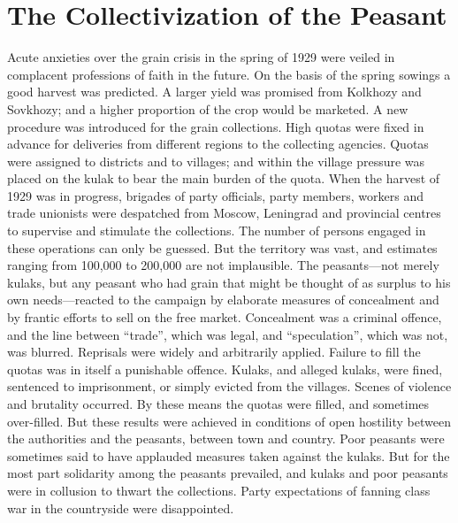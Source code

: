 \chapter{The Collectivization of the Peasant}

Acute anxieties over the grain crisis in the spring of 1929 were veiled in complacent professions of faith in the future. On the basis of the spring sowings a good harvest was predicted. A larger yield was promised from Kolkhozy and Sovkhozy; and a higher proportion of the crop would be marketed. A new procedure was introduced for the grain collections. High quotas were fixed in advance for deliveries from different regions to the collecting agencies. Quotas were assigned to districts and to villages; and within the village pressure was placed on the kulak to bear the main burden of the quota. When the harvest of 1929 was in progress, brigades of party officials, party members, workers and trade unionists were despatched from Moscow, Leningrad and provincial centres to supervise and stimulate the collections. The number of persons engaged in these operations can only be guessed. But the territory was vast, and estimates ranging from 100,000 to 200,000 are not implausible. The peasants---not merely kulaks, but any peasant who had grain that might be thought of as surplus to his own needs---reacted to the campaign by elaborate measures of concealment and by frantic efforts to sell on the free market. Concealment was a criminal offence, and the line between ``trade'', which was legal, and ``speculation'', which was not, was blurred. Reprisals were widely and arbitrarily applied. Failure to fill the quotas was in itself a punishable offence. Kulaks, and alleged kulaks, were fined, sentenced to imprisonment, or simply evicted from the villages. Scenes of violence and brutality occurred. By these means the quotas were filled, and sometimes over-filled. But these results were achieved in conditions of open hostility between the authorities and the peasants, between town and country. Poor peasants were sometimes said to have applauded measures taken against the kulaks. But for the most part solidarity among the peasants prevailed, and kulaks and poor peasants were in collusion to thwart the collections. Party expectations of fanning class war in the countryside were disappointed. 

